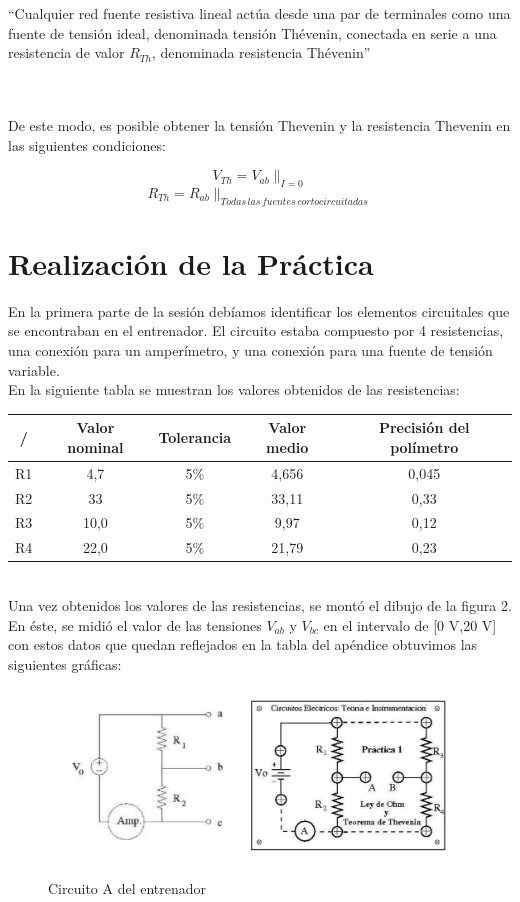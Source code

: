 \documentclass[a4paper,11pt]{article}
\begin{document}
\begin{em}
“Cualquier red fuente resistiva lineal actúa desde una par de terminales como una fuente de tensión ideal, denominada tensión Thévenin, conectada en serie a una resistencia de valor $R_{Th}$, denominada resistencia Thévenin”
\end{em}\\ \\
De este modo, es posible obtener la tensión Thevenin y la resistencia Thevenin en las siguientes condiciones:

\begin{displaymath}
V_{Th}=V_{ab}\|_{I=0}
\end{displaymath}
\begin{displaymath}
R_{Th}=R_{ab}\|_{Todas\,las\,fuentes\,cortocircuitadas}
\end{displaymath}

\newpage
\section{Realización de la Práctica}
En la primera parte de la sesión debíamos identificar los elementos circuitales que se encontraban en el entrenador. El circuito estaba compuesto por 4 resistencias, una conexión para un amperímetro, y una conexión para una fuente de tensión variable.\\
En la siguiente tabla se muestran los valores obtenidos de las resistencias:\\

\begin{tabular}{|c|c|c|c|c|}
\hline 
/ & Valor nominal & Tolerancia & Valor medio & Precisión del polímetro \\ 
\hline 
R1 & 4,7 & 5\% & 4,656 & 0,045 \\ 
\hline 
R2 & 33 & 5\% & 33,11 & 0,33 \\ 
\hline 
R3 & 10,0 & 5\% & 9,97 & 0,12 \\ 
\hline 
R4 & 22,0 & 5\% & 21,79 & 0,23 \\ 
\hline 
\end{tabular}\\

Una vez obtenidos los valores de las resistencias, se montó el dibujo de la figura 2. En éste, se midió el valor de las tensiones $V_{ab}$ y $V_{bc}$ en el intervalo de [0 V,20 V] con estos datos que quedan reflejados en la tabla del apéndice obtuvimos las siguientes gráficas:


\begin{figure}[hbtp]
\centering
\includegraphics[scale=0.5]{Imagenes/Entrenador.png}
\caption{Circuito A del entrenador}
\end{figure}
\end{document}
